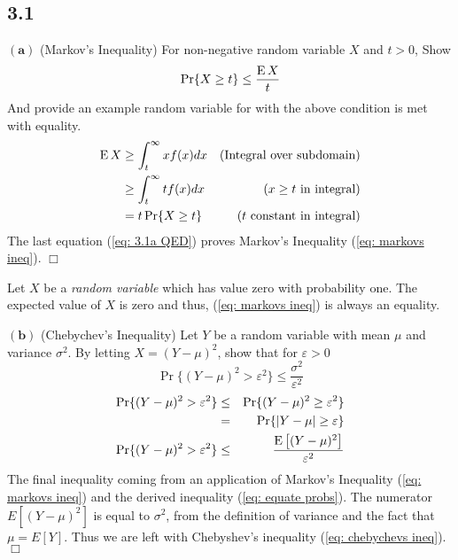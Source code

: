 \documentclass[10pt]{article}
\DeclareMathOperator*{\E}{\mbox{\text{E}}}
\newcommand{\pref}[1]{{(\ref{#1})}}
\begin{document}
\begin{tiny}
\begin{multicols}{3}
\section*{3.1} %
$\mathbf{(a)}$
(Markov's Inequality) For non-negative random variable $X$ and  $t>0$,
Show
\begin{equation}
    \Pr\{X \geq t\} \leq \frac{\E X}{t} \label{eq: markovs ineq}
\end{equation}
And provide an example random variable for with the above condition is met
with equality.
\proof
\begin{eqnarray}
    \E X %
    &\geq \int_t^\infty x f(x)dx &\text{(Integral over subdomain)} 
    \nonumber \\
    &\geq \int_t^\infty t f(x)dx &\text{($x \geq t$ in integral)} 
        \nonumber \\
    &= t \Pr\{X \geq t\}  &\text{($t$ constant in integral)}
        \label{eq: 3.1a QED}
\end{eqnarray}
The last equation \pref{eq: 3.1a QED} proves Markov's Inequality
\pref{eq: markovs ineq}. $\Box$

Let $X$ be a \emph{random variable} which has value zero with probability
one.
The expected value of $X$ is zero and thus, 
\pref{eq: markovs ineq} is always an equality.

$\mathbf{(b)}$
(Chebychev's Inequality) Let $Y$ be a random variable with mean $\mu$ and
variance $\sigma^2$. By letting $X = (Y-\mu)^2$, show that for
$\varepsilon > 0$
\begin{equation}
    \Pr \{(Y-\mu)^2 > \varepsilon^2\} \leq \frac{\sigma^2}{\varepsilon^2}
    \label{eq: chebychevs ineq}
\end{equation}
\proof
\begin{eqnarray}
    \Pr\{(Y-\mu)^2 > \varepsilon^2\} &\leq& \Pr\{(Y-\mu)^2 \geq \varepsilon^2\}
        \nonumber \\
        &=& \Pr\{|Y-\mu| \geq \varepsilon\}
        \label{eq: equate probs} \\
    \Pr \{(Y-\mu)^2 > \varepsilon^2\} &\leq& \frac{\E \big[(Y-\mu)^2\big]}{\varepsilon^2}
        \label{eq:instatiate 3.1a}
\end{eqnarray}
The final inequality coming from an application of Markov's Inequality
\pref{eq: markovs ineq} and the derived inequality \pref{eq: equate probs}.
The numerator $E[(Y-\mu)^2]$ is equal to $\sigma^2$, from the definition
of variance and the fact that $\mu = E[Y]$. Thus we are left with
Chebyshev's inequality \pref{eq: chebychevs ineq}. $\Box$


\end{multicols}
\end{tiny}
\end{document}
